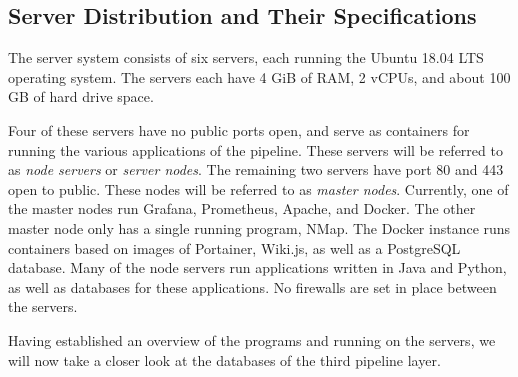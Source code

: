 \subsection{Server Distribution and Their Specifications}
The \knox{} server system consists of six servers, each running the Ubuntu 18.04 LTS operating system.
The servers each have 4 GiB of RAM, 2 vCPUs, and about 100 GB of hard drive space. 

Four of these servers have no public ports open, and serve as containers for running the various applications of the \knox{} pipeline.
These servers will be referred to as \textit{node servers} or \textit{server nodes}.
The remaining two servers have port 80 and 443 open to public. These nodes will be referred to as \textit{master nodes}.
Currently, one of the master nodes run Grafana\cite{GRAFANA}, Prometheus\cite{Prometheus}, Apache\cite{ApacheJena}, and Docker\cite{Docker_IBM}.
The other master node only has a single running program, NMap\cite{NMap}.
The Docker instance runs containers based on images of Portainer, Wiki.js, as well as a PostgreSQL database.
Many of the node servers run applications written in Java and Python, as well as databases for these applications. 
No firewalls are set in place between the servers.

Having established an overview of the programs and running on the servers, we will now take a closer look at the databases of the third pipeline layer.
